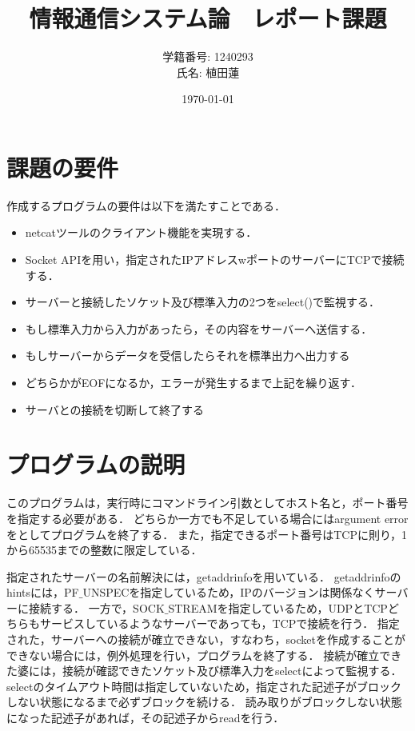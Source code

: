 \documentclass[a4paper,dvipdfmx]{jsarticle}
\title{情報通信システム論　レポート課題}
\author{学籍番号: 1240293 \\ 氏名: 植田蓮}
\date{\today}
\begin{document}
\maketitle
{}
\section{課題の要件}
作成するプログラムの要件は以下を満たすことである．

\begin{itemize}
  \item netcatツールのクライアント機能を実現する．
  \item Socket APIを用い，指定されたIPアドレスwポートのサーバーにTCPで接続する．
  \item サーバーと接続したソケット及び標準入力の2つをselect()で監視する．
  \item もし標準入力から入力があったら，その内容をサーバーへ送信する．
  \item もしサーバーからデータを受信したらそれを標準出力へ出力する
  \item どちらかがEOFになるか，エラーが発生するまで上記を繰り返す．
  \item サーバとの接続を切断して終了する
\end{itemize}

\section{プログラムの説明}
このプログラムは，実行時にコマンドライン引数としてホスト名と，ポート番号を指定する必要がある．
どちらか一方でも不足している場合にはargument errorをとしてプログラムを終了する．
また，指定できるポート番号はTCPに則り，1から65535までの整数に限定している．

指定されたサーバーの名前解決には，getaddrinfoを用いている．
getaddrinfoのhintsには，PF$\_$UNSPECを指定しているため，IPのバージョンは関係なくサーバーに接続する．
一方で，SOCK$\_$STREAMを指定しているため，UDPとTCPどちらもサービスしているようなサーバーであっても，TCPで接続を行う．
指定された，サーバーへの接続が確立できない，すなわち，socketを作成することができない場合には，例外処理を行い，プログラムを終了する．
接続が確立できた婆には，接続が確認できたソケット及び標準入力をselectによって監視する．
selectのタイムアウト時間は指定していないため，指定された記述子がブロックしない状態になるまで必ずブロックを続ける．
読み取りがブロックしない状態になった記述子があれば，その記述子からreadを行う．
\end{document}
